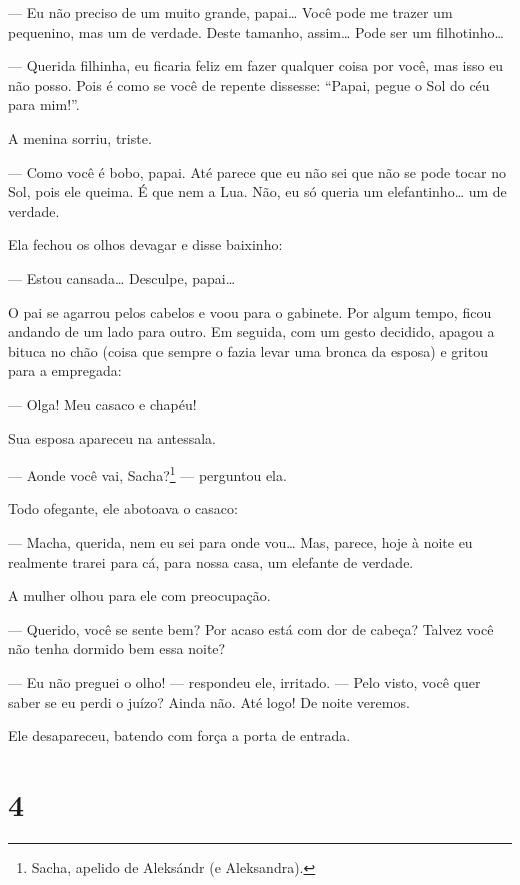 --- Eu não preciso de um muito grande, papai\ldots{} Você pode me trazer um
pequenino, mas um de verdade. Deste tamanho, assim\ldots{} Pode ser um
filhotinho\ldots{}

--- Querida filhinha, eu ficaria feliz em fazer qualquer coisa por
você, mas isso eu não posso. Pois é como se você de repente dissesse:
``Papai, pegue o Sol do céu para mim!''.

A menina sorriu, triste.

--- Como você é bobo, papai. Até parece que eu não sei que não se pode
tocar no Sol, pois ele queima. É que nem a Lua. Não, eu só queria um
elefantinho\ldots{} um de verdade.

Ela fechou os olhos devagar e disse baixinho:

--- Estou cansada\ldots{} Desculpe, papai\ldots{}

O pai se agarrou pelos cabelos e voou para o gabinete. Por algum
tempo, ficou andando de um lado para outro. Em seguida, com um gesto
decidido, apagou a bituca no chão (coisa que sempre o fazia levar uma
bronca da esposa) e gritou para a empregada:

--- Olga! Meu casaco e chapéu!

Sua esposa apareceu na antessala.

--- Aonde você vai, Sacha?\footnote{Sacha, apelido de Aleksándr (e
  Aleksandra).} --- perguntou ela.

Todo ofegante, ele abotoava o casaco:

--- Macha, querida, nem eu sei para onde vou\ldots{} Mas, parece, hoje à
noite eu realmente trarei para cá, para nossa casa, um elefante de
verdade.

A mulher olhou para ele com preocupação.

--- Querido, você se sente bem? Por acaso está com dor de cabeça? Talvez
você não tenha dormido bem essa noite?

--- Eu não preguei o olho! --- respondeu ele, irritado. --- Pelo visto,
você quer saber se eu perdi o juízo? Ainda não. Até logo! De noite
veremos.

Ele desapareceu, batendo com força a porta de entrada.

\section{4}

